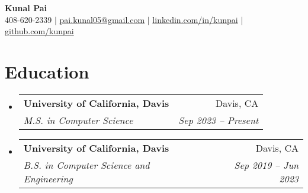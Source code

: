 \documentclass[letterpaper,10pt]{article}
\makeatletter
\newcommand{\resumeSubheading}[4]{
\vspace{-1pt}\item
  \begin{tabular*}{0.97\textwidth}[t]{l@{\extracolsep{\fill}}r}
    \textbf{#1} & #2 \\
    \textit{#3} & \textit{#4} \\
  \end{tabular*}\vspace{-7pt}
}
\newcommand{\resumeSubHeadingList}{\begin{itemize}[leftmargin=0.15in, label={}]}
\newcommand{\resumeSubHeadingListEnd}{\end{itemize}}
\makeatother
\begin{document}
\begin{center}
  \textbf{\Huge Kunal Pai} \\
  \small 408-620-2339 $|$ \href{mailto:pai.kunal05@gmail.com}{pai.kunal05@gmail.com} $|$ 
  \href{https://linkedin.com/in/kunpai}{linkedin.com/in/kunpai} $|$
  \href{https://github.com/kunpai}{github.com/kunpai}
\end{center}

\section{Education}
\resumeSubHeadingList
  \resumeSubheading
      {University of California, Davis}{Davis, CA}
      {M.S. in Computer Science}{Sep 2023 -- Present}
  \resumeSubheading
      {University of California, Davis}{Davis, CA}
      {B.S. in Computer Science and Engineering}{Sep 2019 -- Jun 2023}
\resumeSubHeadingListEnd
\end{document}
